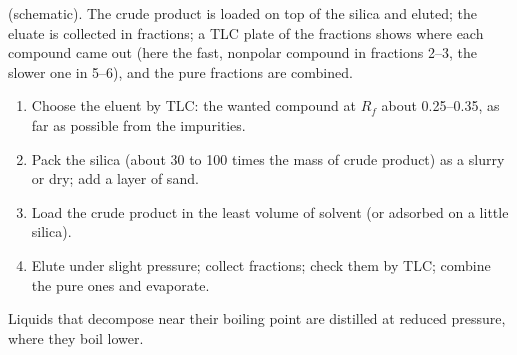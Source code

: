 \begin{omfigure}
\par\vspace{4pt}

{\small {} (schematic). The crude product is loaded on top of the silica and eluted;
the eluate is collected in fractions; a TLC plate of the fractions shows where each compound came out
(here the fast, nonpolar compound in fractions 2--3, the slower one in 5--6), and the pure fractions are
combined.}
\end{omfigure}

\begin{method}\label{met:b2:lab-techniques-2:flash}
\begin{enumerate}
  \item Choose the eluent by TLC: the wanted compound at $R_f$ about 0.25--0.35, as far as possible from
        the impurities.
  \item Pack the silica (about 30 to 100 times the mass of crude product) as a slurry or dry; add a layer
        of sand.
  \item Load the crude product in the least volume of solvent (or adsorbed on a little silica).
  \item Elute under slight pressure; collect fractions; check them by TLC; combine the pure ones and
        evaporate.
\end{enumerate}
\end{method}

Liquids that decompose near their boiling point are distilled at reduced pressure, where they boil
lower.

